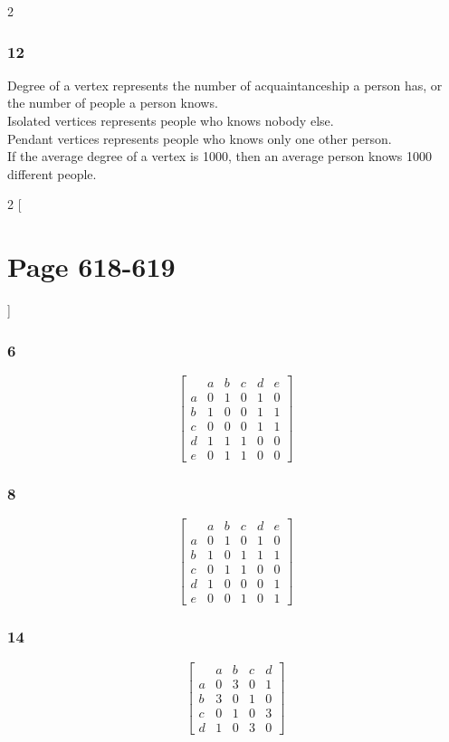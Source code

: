 \documentclass[12pt]{article}
\begin{document}
\begin{multicols}{2}
      \section*{12}
        Degree of a vertex represents the number of acquaintanceship a person has, or the number of people a person knows. \\
        Isolated vertices represents people who knows nobody else. \\
        Pendant vertices represents people who knows only one other person. \\
        If the average degree of a vertex is 1000, then an average person knows 1000 different people.
  \end{multicols}

  \begin{multicols}{2}
    [\part*{Page 618-619}]
    \section*{6}
    \[
    \left[\begin{matrix}
        &a &b &c &d &e \\
      a &0 &1 &0 &1 &0 \\
      b &1 &0 &0 &1 &1 \\
      c &0 &0 &0 &1 &1 \\
      d &1 &1 &1 &0 &0 \\
      e &0 &1 &1 &0 &0
    \end{matrix}\right]
    \]
    \section*{8}
    \[
    \left[\begin{matrix}
        &a &b &c &d &e \\
      a &0 &1 &0 &1 &0 \\
      b &1 &0 &1 &1 &1 \\
      c &0 &1 &1 &0 &0 \\
      d &1 &0 &0 &0 &1 \\
      e &0 &0 &1 &0 &1
    \end{matrix}\right]
    \]
    \section*{14}
    \[
    \left[\begin{matrix}
        &a &b &c &d \\
      a &0 &3 &0 &1 \\
      b &3 &0 &1 &0 \\
      c &0 &1 &0 &3 \\
      d &1 &0 &3 &0
    \end{matrix}\right]
    \]

\end{multicols}
\end{document}
